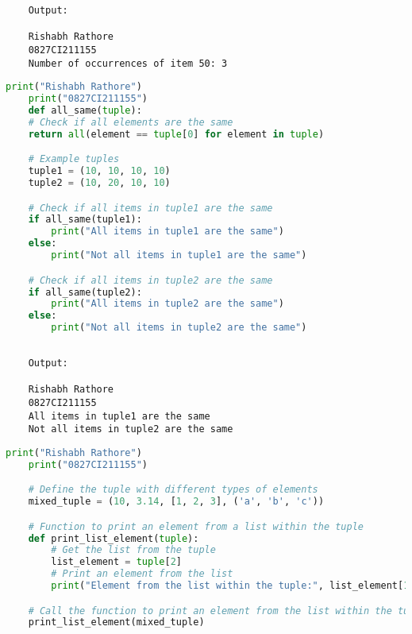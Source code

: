 \documentclass{report}
\begin{document}
\begin{verbatim}
	Output:

	Rishabh Rathore
	0827CI211155
	Number of occurrences of item 50: 3
\end{verbatim}



\newpage

\sol 
\begin{lstlisting}[language=Python]
	print("Rishabh Rathore")
	print("0827CI211155")
	def all_same(tuple):
    # Check if all elements are the same
    return all(element == tuple[0] for element in tuple)

	# Example tuples
	tuple1 = (10, 10, 10, 10)
	tuple2 = (10, 20, 10, 10)

	# Check if all items in tuple1 are the same
	if all_same(tuple1):
		print("All items in tuple1 are the same")
	else:
		print("Not all items in tuple1 are the same")

	# Check if all items in tuple2 are the same
	if all_same(tuple2):
		print("All items in tuple2 are the same")
	else:
		print("Not all items in tuple2 are the same")
  

\end{lstlisting}

\begin{verbatim}
	Output:

	Rishabh Rathore
	0827CI211155
	All items in tuple1 are the same
	Not all items in tuple2 are the same

\end{verbatim}




\newpage

\sol 
\begin{lstlisting}[language=Python]
	print("Rishabh Rathore")
	print("0827CI211155")

	# Define the tuple with different types of elements
	mixed_tuple = (10, 3.14, [1, 2, 3], ('a', 'b', 'c'))

	# Function to print an element from a list within the tuple
	def print_list_element(tuple):
		# Get the list from the tuple
		list_element = tuple[2]
		# Print an element from the list
		print("Element from the list within the tuple:", list_element[1])

	# Call the function to print an element from the list within the tuple
	print_list_element(mixed_tuple)

\end{lstlisting}
\end{document}
